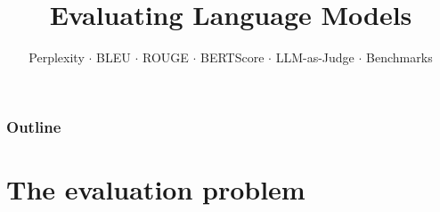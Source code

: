 \documentclass[aspectratio=169]{beamer}
\title{Evaluating Language Models}
\subtitle{Perplexity $\cdot$ BLEU $\cdot$ ROUGE $\cdot$ BERTScore $\cdot$ LLM-as-Judge $\cdot$ Benchmarks}
\date{}
\begin{document}
\begin{frame}
\titlepage
\end{frame}

\begin{frame}
\frametitle{Outline}
\tableofcontents
\end{frame}

\section{The evaluation problem}
\end{document}
